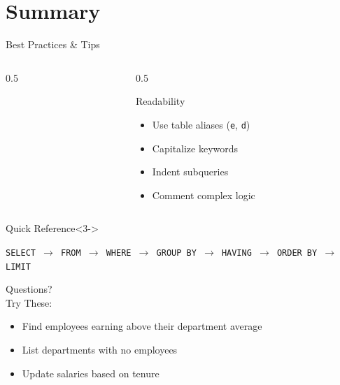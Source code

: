 \documentclass[aspectratio=169,11pt]{beamer}
\begin{document}
\section{Summary}
\begin{frame}{Best Practices \& Tips}
\begin{columns}[T]
\begin{column}{0.5\textwidth}
\end{column}
\pause
\begin{column}{0.5\textwidth}
\begin{block}{Readability}
\begin{itemize}
    \item Use table aliases (\texttt{e}, \texttt{d})
    \item Capitalize keywords
    \item Indent subqueries
    \item Comment complex logic
\end{itemize}
\end{block}
\end{column}
\end{columns}

\pause
\begin{exampleblock}{Quick Reference}<3->
\begin{center}
\texttt{SELECT $\rightarrow$ FROM $\rightarrow$ WHERE $\rightarrow$ GROUP BY $\rightarrow$ HAVING $\rightarrow$ ORDER BY $\rightarrow$ LIMIT}
\end{center}
\end{exampleblock}
\end{frame}

\begin{frame}
\centering
\Huge Questions? \\
\bigskip
\large Try These:
\normalsize
\begin{itemize}
    \item Find employees earning above their department average
    \item List departments with no employees
    \item Update salaries based on tenure
\end{itemize}
\end{frame}
\end{document}
